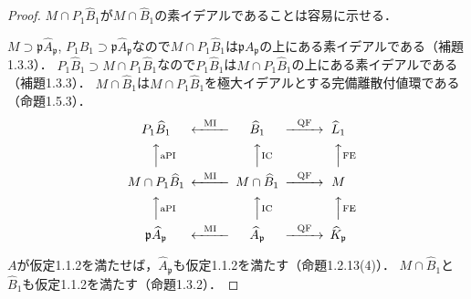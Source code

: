 \begin{proof}
  $M\cap P_1\widehat{B}_1$が$M\cap\widehat{B}_1$の素イデアルであることは容易に示せる．

  $M\supset\mathfrak{p}\widehat{A}_\mathfrak{p}$, $P_1\widehat{B}_1\supset\mathfrak{p}\widehat{A}_\mathfrak{p}$なので$M\cap P_1\widehat{B}_1$は$\mathfrak{p}A_\mathfrak{p}$の上にある素イデアルである（補題1.3.3）．
  $P_1\widehat{B}_1\supset M\cap P_1\widehat{B}_1$なので$P_1\widehat{B}_1$は$M\cap P_1\widehat{B}_1$の上にある素イデアルである（補題1.3.3）．
  $M\cap\widehat{B}_1$は$M\cap P_1\widehat{B}_1$を極大イデアルとする完備離散付値環である（命題1.5.3）．
  \[
  \begin{CD}
    P_1\widehat{B}_1                     @<\text{MI}<< \widehat{B}_1            @>\text{QF}>> \widehat{L}_1\\
    @AA\text{aPI}A                   @AA\text{IC}A                      @AA\text{FE}A \\
    M\cap P_1\widehat{B}_1               @<\text{MI}<< M\cap\widehat{B}_1       @>\text{QF}>> M\\
    @AA\text{aPI}A                   @AA\text{IC}A                      @AA\text{FE}A \\
    \mathfrak{p}\widehat{A}_\mathfrak{p} @<\text{MI}<< \widehat{A}_\mathfrak{p} @>\text{QF}>> \widehat{K}_\mathfrak{p}
  \end{CD}
  \]

  $A$が仮定1.1.2を満たせば，$\widehat{A}_\mathfrak{p}$も仮定1.1.2を満たす（命題1.2.13(4)）．
  $M\cap\widehat{B}_1$と$\widehat{B}_1$も仮定1.1.2を満たす（命題1.3.2）．
\end{proof}

